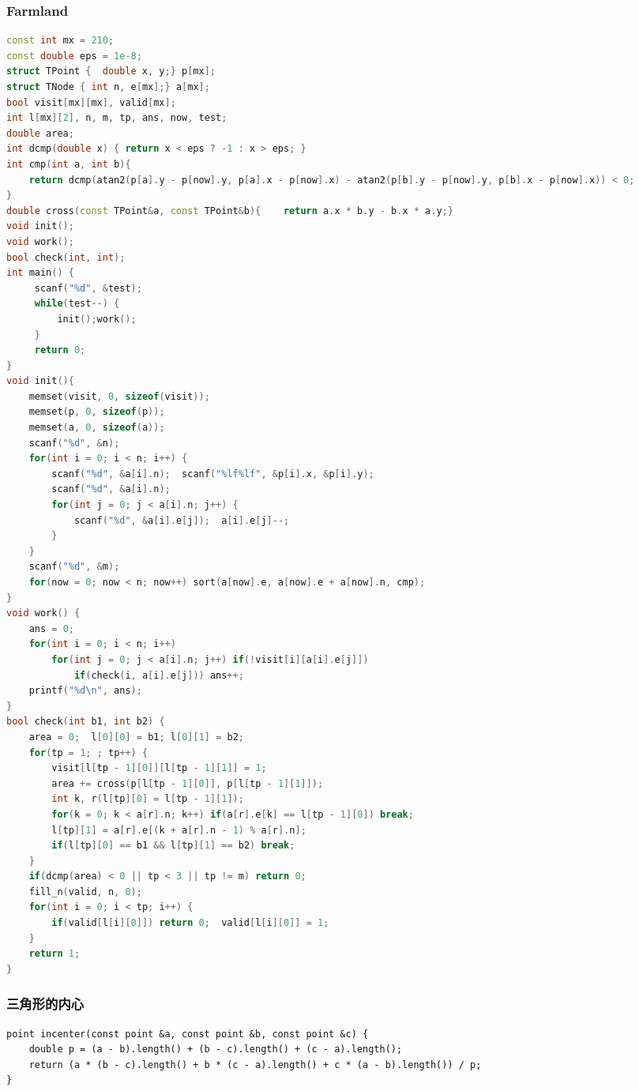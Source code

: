 \documentclass[landscape,a4paper]{article}
\begin{document}
\begin{spacing}{0.3}
\begin{multicols}{2}
\subsubsection{Farmland}
\begin{lstlisting}[language=C++]
const int mx = 210;
const double eps = 1e-8;
struct TPoint {  double x, y;} p[mx];
struct TNode { int n, e[mx];} a[mx];
bool visit[mx][mx], valid[mx];
int l[mx][2], n, m, tp, ans, now, test;
double area;
int dcmp(double x) { return x < eps ? -1 : x > eps; }
int cmp(int a, int b){
    return dcmp(atan2(p[a].y - p[now].y, p[a].x - p[now].x) - atan2(p[b].y - p[now].y, p[b].x - p[now].x)) < 0;
}
double cross(const TPoint&a, const TPoint&b){    return a.x * b.y - b.x * a.y;}
void init();
void work();
bool check(int, int);
int main() {
     scanf("%d", &test);
     while(test--) {
         init();work();
     }
     return 0;
}
void init(){
    memset(visit, 0, sizeof(visit));
    memset(p, 0, sizeof(p));
    memset(a, 0, sizeof(a));
    scanf("%d", &n);
    for(int i = 0; i < n; i++) {
        scanf("%d", &a[i].n);  scanf("%lf%lf", &p[i].x, &p[i].y);
        scanf("%d", &a[i].n);
        for(int j = 0; j < a[i].n; j++) {
            scanf("%d", &a[i].e[j]);  a[i].e[j]--;
        }
    }
    scanf("%d", &m);
    for(now = 0; now < n; now++) sort(a[now].e, a[now].e + a[now].n, cmp);
}
void work() {
    ans = 0;
    for(int i = 0; i < n; i++)
        for(int j = 0; j < a[i].n; j++) if(!visit[i][a[i].e[j]])
            if(check(i, a[i].e[j])) ans++;
    printf("%d\n", ans);
}
bool check(int b1, int b2) {
    area = 0;  l[0][0] = b1; l[0][1] = b2;
    for(tp = 1; ; tp++) {
        visit[l[tp - 1][0]][l[tp - 1][1]] = 1;
        area += cross(p[l[tp - 1][0]], p[l[tp - 1][1]]);
        int k, r(l[tp][0] = l[tp - 1][1]);
        for(k = 0; k < a[r].n; k++) if(a[r].e[k] == l[tp - 1][0]) break;
        l[tp][1] = a[r].e[(k + a[r].n - 1) % a[r].n];
        if(l[tp][0] == b1 && l[tp][1] == b2) break;
    }
    if(dcmp(area) < 0 || tp < 3 || tp != m) return 0;
    fill_n(valid, n, 0);
    for(int i = 0; i < tp; i++) {
        if(valid[l[i][0]]) return 0;  valid[l[i][0]] = 1;
    }
    return 1;
}
\end{lstlisting}
\subsubsection{三角形的内心}
\begin{lstlisting}
point incenter(const point &a, const point &b, const point &c) {
	double p = (a - b).length() + (b - c).length() + (c - a).length();
	return (a * (b - c).length() + b * (c - a).length() + c * (a - b).length()) / p;
}
\end{lstlisting}
	

\end{multicols}
\end{spacing}
\end{document}
